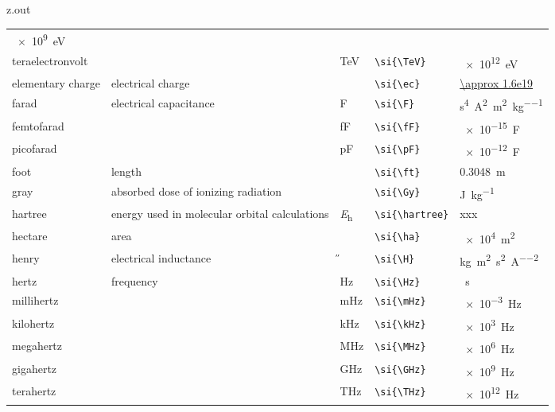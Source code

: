 \begin{VerbatimOut}{z.out}
{\begin{longtable}{@{}P{1.4in}P{1in}llP{1.8in}@{}}
      \SI{e9}{\eV}\\
    \quad teraelectronvolt&
      \ditto&
      \si{\TeV}&
      \verb+\si{\TeV}+&
      \SI{e12}{\eV}\\
    \vsp
    elementary charge&
      electrical charge&
      \si{\ec}&
      \verb+\si{\ec}+&
      \href{https://en.wikipedia.org/wiki/Elementary_charge}{\SI{\approx 1.6e19}{\C}}\\
    \vsp
    farad&
      electrical capacitance&
      \si{\F}&
      \verb+\si{\F}+&
      \si{\s\tothe{4}\A\squared\per\m\squared\per\kg}\\
    \quad femtofarad&
      \ditto&
      \si{\fF}&
      \verb+\si{\fF}+&
      \SI{e-15}{\F}\\
    \quad picofarad&
      \ditto&
      \si{\pF}&
      \verb+\si{\pF}+&
      \SI{e-12}{\F}\\
    \vsp
    foot&
      length&
      \si{\ft}&
      \verb+\si{\ft}+&
      \SI{0.3048}{\m}\\  %
    \vsp
    gray&
      absorbed dose of ionizing radiation&
      \si{\Gy}&
      \verb+\si{\Gy}+&
      \si{\J\per\kg}\\
    \vsp
    hartree&
      energy used in molecular orbital calculations&
      \si{\hartree}&
      \verb+\si{\hartree}+&
      xxx\\
    \vsp
    hectare&
      area&
      \si{\ha}&
      \verb+\si{\ha}+&
      \SI{e4}{\m\squared}\\
    \vsp
    henry&
      electrical inductance&
      \si{\H}&
      \verb+\si{\H}+&
      \si{\kg\m\squared\per\s\squared\per\A\squared}\\
    \vsp
    hertz&
      frequency&
      \si{\Hz}&
      \verb+\si{\Hz}+&
      \si{\per\s}\\
    \quad millihertz&
      \ditto&
      \si{\mHz}&
      \verb+\si{\mHz}+&
      \SI{e-3}{\Hz}\\
    \quad kilohertz&
      \ditto&
      \si{\kHz}&
      \verb+\si{\kHz}+&
      \SI{e3}{\Hz}\\
    \quad megahertz&
      \ditto&
      \si{\MHz}&
      \verb+\si{\MHz}+&
      \SI{e6}{\Hz}\\
    \quad gigahertz&
      \ditto&
      \si{\GHz}&
      \verb+\si{\GHz}+&
      \SI{e9}{\Hz}\\
    \quad terahertz&
      \ditto&
      \si{\THz}&
      \verb+\si{\THz}+&
      \SI{e12}{\Hz}\\

\end{longtable}}
\end{VerbatimOut}
